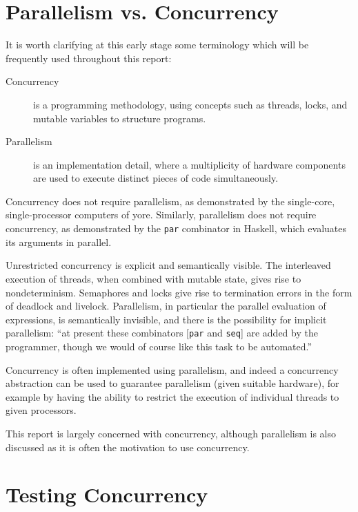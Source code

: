 \section{Parallelism vs. Concurrency}
\label{sec:intro-parconc}

It is worth clarifying at this early stage some terminology which will
be frequently used throughout this report:

\begin{description}
  \item[Concurrency] is a programming methodology, using concepts such
    as threads, locks, and mutable variables to structure
    programs.

  \item[Parallelism] is an implementation detail, where a multiplicity
    of hardware components are used to execute distinct pieces of code
    simultaneously.
\end{description}

Concurrency does not require parallelism, as demonstrated by the
single-core, single-processor computers of yore. Similarly,
parallelism does not require concurrency, as demonstrated by the
\verb|par| combinator in Haskell, which evaluates its arguments in
parallel.

Unrestricted concurrency is explicit and semantically
visible\cite{concurrent}. The interleaved execution of threads, when
combined with mutable state, gives rise to nondeterminism. Semaphores
and locks give rise to termination errors in the form of deadlock and
livelock. Parallelism, in particular the parallel evaluation of
expressions, is semantically invisible, and there is the possibility
for implicit parallelism: ``at present these combinators [\verb|par|
and \verb|seq|] are added by the programmer, though we would of course
like this task to be automated.''\cite{gum}

Concurrency is often implemented using parallelism, and indeed a
concurrency abstraction can be used to guarantee parallelism (given
suitable hardware), for example by having the ability to restrict the
execution of individual threads to given processors.

This report is largely concerned with concurrency, although
parallelism is also discussed as it is often the motivation to use
concurrency.

\section{Testing Concurrency}
\label{sec:intro-sct}

